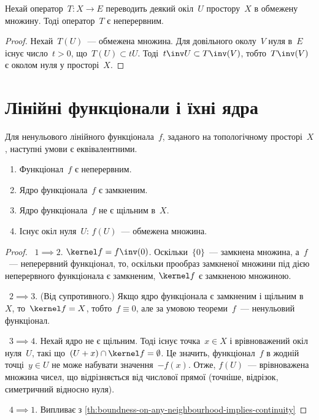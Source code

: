\begin{theorem}
    \label{th:boundness-on-any-neighbourhood-implies-continuity}
    Нехай оператор~$T: X \to E$ переводить деякий окіл~$U$ простору~$X$ в обмежену множину. Тоді оператор~$T$ є неперервним.
\end{theorem}

\begin{proof}
    Нехай~$T(U)$~--- обмежена множина. Для довільного околу~$V$ нуля в~$E$ існує число~$t > 0$, що~$T(U) \subset t U$. Тоді~$t\inv U \subset T\inv(V)$, тобто~$T\inv(V)$ є околом нуля у просторі~$X$.
\end{proof}

\section{Лінійні функціонали і їхні ядра}

\begin{theorem}
    \label{th:linear-functional-continuity-equivalent-conditions}
    Для ненульового лінійного функціонала~$f$, заданого на топологічному просторі~$X$, наступні умови є еквівалентними.
    \begin{enumerate}
        \item Функціонал~$f$ є неперервним.
        \item Ядро функціонала~$f$ є замкненим.
        \item Ядро функціонала~$f$ не є щільним в~$X$.
        \item Існує окіл нуля~$U$: $f(U)$~--- обмежена множина.
    \end{enumerate}
\end{theorem}

\begin{proof}
   ~$1 \implies 2$. $\kernel f = f\inv(0)$. Оскільки~$\{0\}$~--- замкнена множина, а~$f$~--- неперервний функціонал, то, оскільки прообраз замкненої множини під дією неперервного функціонала є замкненим, $\kernel f$ є замкненою множиною.

   ~$2 \implies 3$. (Від супротивного.) Якщо ядро функціонала є замкненим і щільним в~$X$, то~$\kernel f = X$, тобто~$f \equiv 0$, але за умовою теореми~$f$~--- ненульовий функціонал.

   ~$3 \implies 4$. Нехай ядро не є щільним. Тоді існує точка~$x \in X$ і врівноважений окіл нуля~$U$, такі що~$(U + x) \cap \kernel f = \emptyset$. Це значить, функціонал~$f$ в жодній точці~$y \in U$ не може набувати значення~$-f(x)$. Отже, $f(U)$~--- врівноважена множина чисел, що відрізняється від числової прямої (точніше, відрізок, симетричний відносно нуля).

   ~$4 \implies 1$. Випливає з \cref{th:boundness-on-any-neighbourhood-implies-continuity}
\end{proof}


